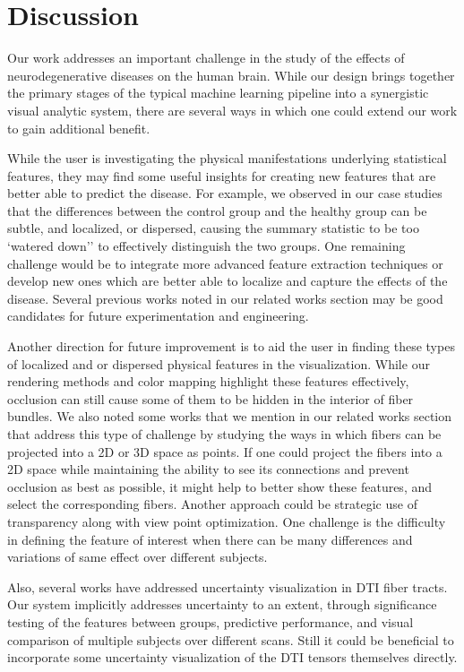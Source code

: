 \section{Discussion}

Our work addresses an important challenge in the study of the effects of neurodegenerative diseases on the human brain. While our design brings together the primary stages of the typical machine learning pipeline into a synergistic visual analytic system, there are several ways in which one could extend our work to gain additional benefit.

While the user is investigating the physical manifestations underlying statistical features, they may find some useful insights for creating new features that are better able to predict the disease. For example, we observed in our case studies that the differences between the control group and the healthy group can be subtle, and localized, or dispersed, causing the summary statistic to be too `watered down'' to effectively distinguish the two groups. One remaining challenge would be to integrate more advanced feature extraction techniques or develop new ones which are better able to localize and capture the effects of the disease. Several previous works\cite{dinov2016predictive, zhang2015detection, plant2010automated} noted in our related works section may be good candidates for future experimentation and engineering. 

Another direction for future improvement is to aid the user in finding these types of localized and or dispersed physical features in the visualization. While our rendering methods and color mapping highlight these features effectively, occlusion can still cause some of them to be hidden in the interior of fiber bundles. We also noted some works\cite{jianu2009exploring,jianu2012exploring} that we mention in our related works section that address this type of challenge by studying the ways in which fibers can be projected into a 2D or 3D space as points. If one could project the fibers into a 2D space while maintaining the ability to see its connections and prevent occlusion as best as possible, it might help to better show these features, and select the corresponding fibers. Another approach could be strategic use of transparency along with view point optimization. One challenge is the difficulty in defining the feature of interest when there can be many differences and variations of same effect over different subjects.

Also, several works have addressed uncertainty visualization in DTI fiber tracts. Our system implicitly addresses uncertainty to an extent, through significance testing of the features between groups, predictive performance, and visual comparison of multiple subjects over different scans. Still it could be beneficial to incorporate some uncertainty visualization of the DTI tensors themselves directly.

